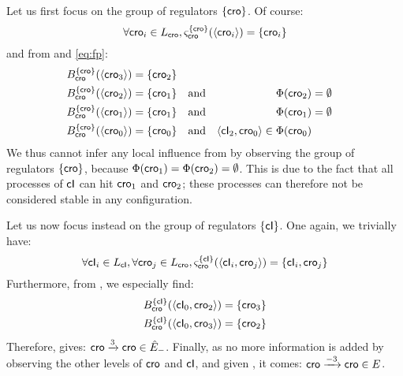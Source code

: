 Let us first focus on the group of regulators $\{ \mathsf{cro} \}$.
Of course:
\[\forall \mathsf{cro}_i \in L_{\mathsf{cro}}, \varsigma_{\mathsf{cro}}^{\{ \mathsf{cro} \}}(\langle \mathsf{cro}_i \rangle) = \{ \mathsf{cro}_i \}\]
and from  and \eqref{eq:fp}:
\begin{align*}
  B_{\mathsf{cro}}^{\{ \mathsf{cro} \}}(\langle \mathsf{cro}_3 \rangle) &= \{ \mathsf{cro}_2 \} && \\
  B_{\mathsf{cro}}^{\{ \mathsf{cro} \}}(\langle \mathsf{cro}_2 \rangle) &= \{ \mathsf{cro}_1 \} && \text{and} &
    \Phi&(\mathsf{cro}_2) = \emptyset \\
  B_{\mathsf{cro}}^{\{ \mathsf{cro} \}}(\langle \mathsf{cro}_1 \rangle) &= \{ \mathsf{cro}_1 \} && \text{and} &
    \Phi&(\mathsf{cro}_1) = \emptyset \\
  B_{\mathsf{cro}}^{\{ \mathsf{cro} \}}(\langle \mathsf{cro}_0 \rangle) &= \{ \mathsf{cro}_0 \} && \text{and} &
    \langle \mathsf{cI}_2, \mathsf{cro}_0 \rangle \in \Phi&(\mathsf{cro}_0)
\end{align*}
We thus cannot infer any local influence from 
by observing the group of regulators $\{ \mathsf{cro} \}$,
because $\Phi(\mathsf{cro}_1) = \Phi(\mathsf{cro}_2) = \emptyset$.
This is due to the fact that all processes of $\mathsf{cI}$ can hit $\mathsf{cro}_1$ and $\mathsf{cro}_2$;
these processes can therefore not be considered stable in any configuration.

Let us now focus instead on the group of regulators $\{ \mathsf{cI} \}$.
One again, we trivially have:
\[\forall \mathsf{cI}_i \in L_{\mathsf{cI}}, \forall \mathsf{cro}_j \in L_{\mathsf{cro}},
  \varsigma_{\mathsf{cro}}^{\{ \mathsf{cI} \}}(\langle \mathsf{cI}_i, \mathsf{cro}_j \rangle) = \{ \mathsf{cI}_i, \mathsf{cro}_j \}\]
Furthermore, from , we especially find:
\begin{align*}
  B_{\mathsf{cro}}^{\{ \mathsf{cI} \}}(\langle \mathsf{cI}_0, \mathsf{cro}_2 \rangle) &= \{ \mathsf{cro}_3 \} \\
  B_{\mathsf{cro}}^{\{ \mathsf{cI} \}}(\langle \mathsf{cI}_0, \mathsf{cro}_3 \rangle) &= \{ \mathsf{cro}_2 \}
\end{align*}
Therefore,  gives: $\mathsf{cro} \xrightarrow{3} \mathsf{cro} \in \hat{E}_-$.
Finally, as no more information is added by observing the other levels of $\mathsf{cro}$ and $\mathsf{cI}$,
and given , it comes: $\mathsf{cro} \xrightarrow{- 3} \mathsf{cro} \in E$.



